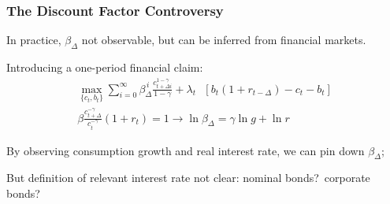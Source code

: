 \documentclass[xcolor=x11names,compress,aspectratio=169]{beamer}%
\makeatletter
\newenvironment{stepitemizewithalert}{\begin{itemize}[<+-| alert@+>]}{\end{itemize} }
\renewenvironment{itemize}{\begin{compactitemize}[<+-| alert@+>]}{\end{compactitemize}}
\renewenvironment{stepitemizewithalert}{\begin{compactitemize}[<+-| alert@+>]}{\end{compactitemize}}
\renewenvironment{stepitemizewithalert}{\begin{itemize}}{\end{itemize}}
\makeatother
\begin{document}
\begin{frame}%
%

\frametitle{The Discount Factor Controversy}%


\begin{stepitemizewithalert}
\item In practice, $\beta_{\Delta}$ not observable, but can be inferred from
financial markets.%
\vspace{1.5ex}%


\item Introducing a one-period financial claim:%
\begin{gather*}
\max_{\{c_{t},b_{t}\}}\sum_{i=0}^{\infty}\beta_{\Delta}^{\,i}\frac{c_{t+\Delta
i}^{1-\gamma}}{1-\gamma}+\lambda_{t}\text{ }\left[  b_{t}\left(
1+r_{t-\Delta}\right)  -c_{t}-b_{t}\right]  \\
\beta\frac{c_{t+\Delta}^{-\gamma}}{c_{t}^{-\gamma}}\left(  1+r_{t}\right)
=1\rightarrow\ln\beta_{\Delta}=\gamma\ln g+\ln r
\end{gather*}


\item By observing consumption growth and real interest rate, we can pin down
$\beta_{\Delta}$;%
\vspace{1.5ex}%


\item But definition of relevant interest rate not clear: nominal
bonds?\ corporate bonds?%
\end{stepitemizewithalert}

%

\transboxout
\end{frame}%
%
\end{document}
